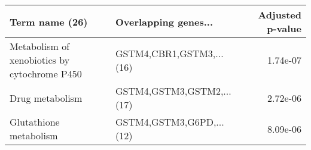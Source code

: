 \begin{tabular}{llr}
\toprule
                              Term name (26) &      Overlapping genes... &  Adjusted p-value \\
\midrule
Metabolism of xenobiotics by cytochrome P450 &  GSTM4,CBR1,GSTM3,...(16) &          1.74e-07 \\
                             Drug metabolism & GSTM4,GSTM3,GSTM2,...(17) &          2.72e-06 \\
                      Glutathione metabolism &  GSTM4,GSTM3,G6PD,...(12) &          8.09e-06 \\
\bottomrule
\end{tabular}
